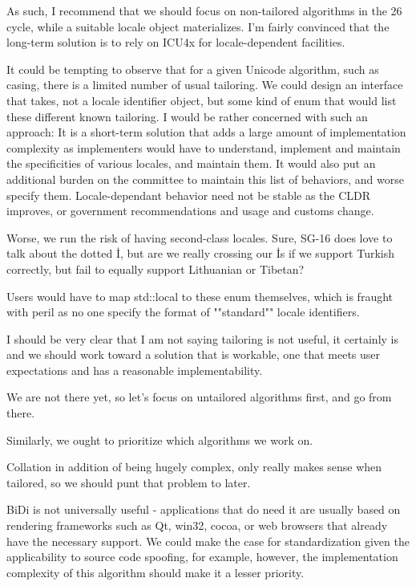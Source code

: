 \documentclass{wg21}
\begin{document}
As such, I recommend that we should focus on non-tailored algorithms in the 26 cycle, while a suitable locale object materializes.
I'm fairly convinced that the long-term solution is to rely on ICU4x for locale-dependent facilities.

It could be tempting to observe that for a given Unicode algorithm, such as casing, there is a limited number of usual tailoring.
We could design an interface that takes, not a locale identifier object, but some kind of enum that would list these different known tailoring.
I would be rather concerned with such an approach: It is a short-term solution that adds a large amount of implementation complexity as implementers would have to understand, implement and maintain the specificities of various locales, and maintain them.
It would also put an additional burden on the committee to maintain this list of behaviors, and worse specify them. Locale-dependant behavior need not be stable as
the CLDR improves, or government recommendations and usage and customs change.

Worse, we run the risk of having second-class locales. Sure, SG-16 does love to talk about the dotted İ, but are we really crossing our İs if we support Turkish correctly, but fail to equally support Lithuanian or Tibetan?

Users would have to map std::local to these enum themselves, which is fraught with peril as no one specify the format of ""standard"" locale identifiers.

I should be very clear that I am not saying tailoring is not useful, it certainly is and we should work toward a solution that is workable, one that meets user expectations and has a reasonable implementability.

We are not there yet, so let's focus on untailored algorithms first, and go from there.

Similarly, we ought to prioritize which algorithms we work on.

Collation in addition of being hugely complex, only really makes sense when tailored, so we should punt that problem to later.

BiDi is not universally useful - applications that do need it are usually based on rendering frameworks such as Qt, win32, cocoa, or web browsers that already have the necessary support.
We could make the case for standardization given the applicability to source code spoofing, for example, however, the implementation complexity of this algorithm should make it a lesser priority.
\end{document}

